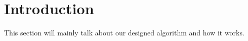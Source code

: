 \section{Introduction}
This section will mainly talk about our designed algorithm and how it works.



